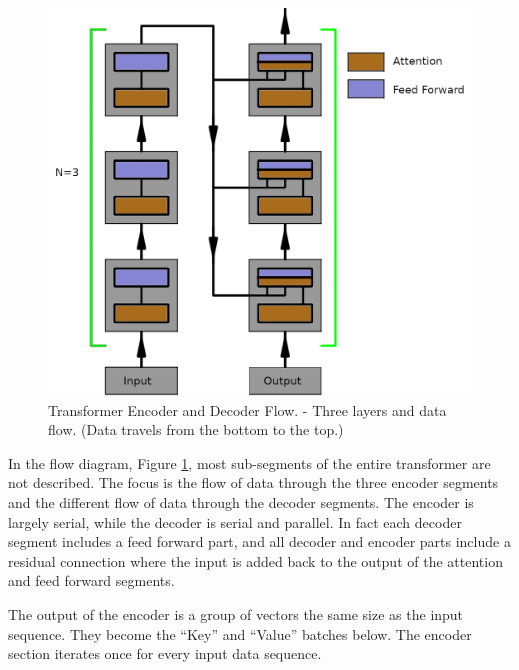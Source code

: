 \begin{figure}[H]
	\begin{center}
		
		
		\includegraphics[scale=1.0]{diagram-flow1}
	\end{center}
	\caption[Transformer Encoder and Decoder Flow]{Transformer Encoder and Decoder Flow. - Three layers and data flow. (Data travels from the bottom to the top.)}
	\label{diagram-flow1}
	
\end{figure}

In the flow diagram, Figure \ref{diagram-flow1}, most sub-segments of the entire transformer are not described. The focus is the flow of data through the three encoder segments and the different flow of data through the decoder segments. The encoder is largely serial, while the decoder is serial and parallel. In fact each decoder segment includes a feed forward part, and all decoder and encoder parts include a residual connection where the input is added back to the output of the attention and feed forward segments.

The output of the encoder is a group of vectors the same size as the input sequence. They become the ``Key'' and ``Value'' batches below. The encoder section iterates once for every input data sequence.


